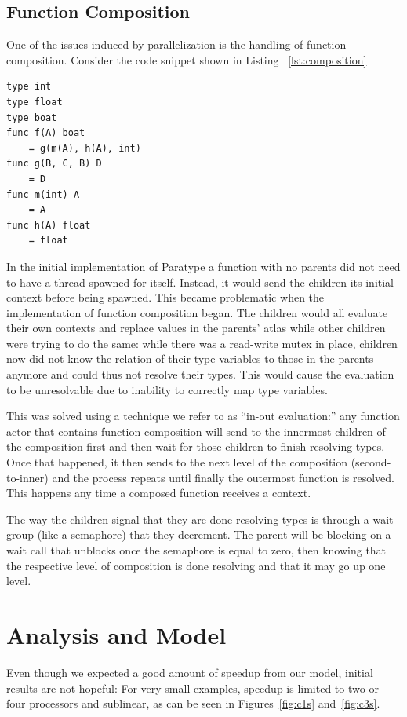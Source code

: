 \documentclass{acm_proc_article-sp}
\begin{document}
	\subsection{Function Composition}
		One of the issues induced by parallelization is the handling of
		function composition. Consider the code snippet shown in Listing
		~\ref{lst:composition} 
\begin{lstlisting}[caption=Small Example of function composition, language=Paratype, label=lst:composition]
type int
type float
type boat
func f(A) boat
	= g(m(A), h(A), int)
func g(B, C, B) D
	= D
func m(int) A
	= A
func h(A) float
	= float
		\end{lstlisting}
In the initial implementation of Paratype a function with no parents did not
need to have a thread spawned for itself. Instead, it would send the children
its initial context before being spawned. This became problematic when the
implementation of function composition began. The
children would all evaluate their own contexts and replace values in the
parents' atlas while other children were trying to do the same: while there was
a read-write mutex in place, children now did not know the relation of their
type variables to those in the parents anymore and could thus not resolve their
types. This would cause the evaluation to be unresolvable due to inability to
correctly map type variables. 

This was solved using a technique we refer to as
``in-out evaluation:'' any function actor that contains function composition
will send to the innermost children of the composition first and then wait for
those children to finish resolving types. Once that happened, it then sends to 
the next level of the composition (second-to-inner) and the process repeats
until finally the outermost function is resolved. This happens any time a
composed function receives a context.

The way the children signal that they are done resolving types is through a
wait group (like a semaphore) that they decrement. The parent will be blocking
on a wait call that unblocks once the semaphore is equal to zero, then knowing
that the respective level of composition is done resolving and that it may go
up one level.

\section{Analysis and Model}

Even though we expected a good amount of speedup from our model, initial
results are not hopeful: For very small examples, speedup is limited to two or
four processors and sublinear, as can be seen in Figures~\ref{fig:c1s}
and~\ref{fig:c3s}. 
\end{document}
